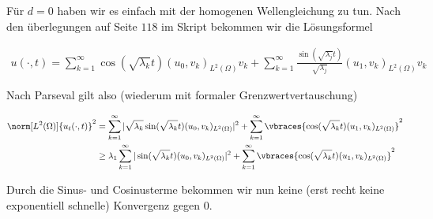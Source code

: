 \begin{solution}
\begin{enumerate}[label = (\roman*)]
	Für $d = 0$ haben wir es einfach mit der homogenen Wellengleichung zu tun. Nach den überlegungen auf Seite $118$ im Skript bekommen wir die Lösungsformel

  \begin{align*}
    u(\cdot, t)
    =
    \sum_{k=1}^\infty \cos(\sqrt{\lambda_k}t) (u_0, v_k)_{L^2(\Omega)} v_k
    +
    \sum_{k=1}^\infty \frac{\sin(\sqrt{\lambda_j }t)}{\sqrt{\lambda_j}} (u_1, v_k)_{L^2(\Omega)} v_k
  \end{align*}

  Nach Parseval gilt also (wiederum mit formaler Grenzwertvertauschung)

  \begin{align*}
    \norm[L^2(\Omega)]{u_t(\cdot, t)}^2
    &=
    \sum_{k=1}^\infty | \sqrt{\lambda_k} \sin(\sqrt{\lambda_k}t) (u_0, v_k)_{L^2(\Omega)}|^2
    +
    \sum_{k=1}^\infty \vbraces{\cos(\sqrt{\lambda_k}t) (u_1, v_k)_{L^2(\Omega)}}^2 \\
    &\geq
    \lambda_1 \sum_{k=1}^\infty |\sin(\sqrt{\lambda_k}t) (u_0, v_k)_{L^2(\Omega)}|^2
    +
    \sum_{k=1}^\infty \vbraces{\cos(\sqrt{\lambda_k}t) (u_1, v_k)_{L^2(\Omega)}}^2
  \end{align*}

  Durch die Sinus- und Cosinusterme bekommen wir nun keine (erst recht keine exponentiell schnelle) Konvergenz gegen 0.
\end{enumerate}

\end{solution}

